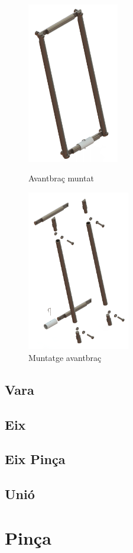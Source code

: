 \documentclass[a4paper, 12pt]{article}
\begin{document}
\begin{figure}[h!]
\begin{minipage}[b]{.45\linewidth}
\centering
\includegraphics[height=7cm]{./imgComp/avant}
\caption{Avantbraç muntat}
\end{minipage}
\begin{minipage}[b]{.45\linewidth}
\centering
\includegraphics[height=7cm]{./imgComp/avant_expl}
\caption{Muntatge avantbraç}
\end{minipage}
\end{figure}

\subsection{Vara}

\subsection{Eix}

\subsection{Eix Pinça}

\subsection{Unió}

\newpage
\section{Pinça}
\end{document}
